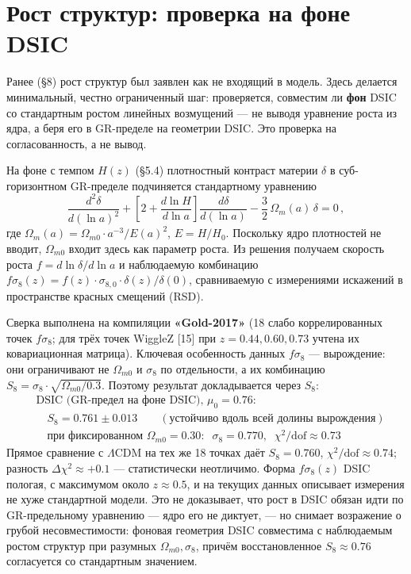 \documentclass{article}
\begin{document}
\section{Рост структур: проверка на фоне DSIC}

Ранее (\S8) рост структур был заявлен как не входящий в модель. Здесь делается минимальный, честно ограниченный шаг: проверяется, совместим ли \textbf{фон} DSIC со стандартным ростом линейных возмущений --- не выводя уравнение роста из ядра, а беря его в GR-пределе на геометрии DSIC. Это проверка на согласованность, а не вывод.

На фоне с темпом $H(z)$ (\S5.4) плотностный контраст материи $\delta$ в суб-горизонтном GR-пределе подчиняется стандартному уравнению
\begin{equation}
\frac{d^2\delta}{d(\ln a)^2} + \left[2 + \frac{d\ln H}{d\ln a}\right]\frac{d\delta}{d(\ln a)} - \frac{3}{2}\,\Omega_m(a)\,\delta = 0\,,
\end{equation}
где $\Omega_m(a) = \Omega_{m0}\cdot a^{-3}/E(a)^2$, $E = H/H_0$. Поскольку ядро плотностей не вводит, $\Omega_{m0}$ входит здесь как параметр роста. Из решения получаем скорость роста $f = d\ln\delta/d\ln a$ и наблюдаемую комбинацию $f\sigma_8(z) = f(z)\cdot\sigma_{8,0}\cdot\delta(z)/\delta(0)$, сравниваемую с измерениями искажений в пространстве красных смещений (RSD).

Сверка выполнена на компиляции \textbf{«Gold-2017»} (18 слабо коррелированных точек $f\sigma_8$; для трёх точек WiggleZ [15] при $z = 0.44, 0.60, 0.73$ учтена их ковариационная матрица). Ключевая особенность данных $f\sigma_8$ --- вырождение: они ограничивают не $\Omega_{m0}$ и $\sigma_8$ по отдельности, а их комбинацию $S_8 = \sigma_8\cdot\sqrt{\Omega_{m0}/0.3}$. Поэтому результат докладывается через $S_8$:
\begin{align*}
&\text{DSIC (GR-предел на фоне DSIC), } \mu_0 = 0.76: \\
&\quad S_8 = 0.761 \pm 0.013 \qquad (\text{устойчиво вдоль всей долины вырождения}) \\
&\quad \text{при фиксированном } \Omega_{m0} = 0.30:\;\; \sigma_8 = 0.770,\;\; \chi^2/\text{dof} \approx 0.73
\end{align*}
Прямое сравнение с $\Lambda$CDM на тех же 18 точках даёт $S_8 = 0.760$, $\chi^2/\text{dof} \approx 0.74$; разность $\Delta\chi^2 \approx +0.1$ --- статистически неотличимо. Форма $f\sigma_8(z)$ DSIC пологая, с максимумом около $z \approx 0.5$, и на текущих данных описывает измерения не хуже стандартной модели. Это не доказывает, что рост в DSIC обязан идти по GR-предельному уравнению --- ядро его не диктует, --- но снимает возражение о грубой несовместимости: фоновая геометрия DSIC совместима с наблюдаемым ростом структур при разумных $\Omega_{m0}, \sigma_8$, причём восстановленное $S_8 \approx 0.76$ согласуется со стандартным значением.
\end{document}
